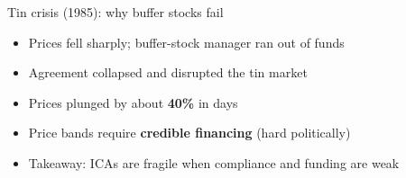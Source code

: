 \documentclass[
  ignorenonframetext,
  aspectratio=169,
]{beamer}
\makeatletter
\providecommand{\tightlist}{%
  \setlength{\itemsep}{0pt}\setlength{\parskip}{0pt}}
\let\quarto@originallabel\label
\DeclareRobustCommand*{\label}[1]{\quarto@originallabel{#1}}
\makeatother
\begin{document}
\begin{frame}{Tin crisis (1985): why buffer stocks fail}
\label{tin-crisis-1985-why-buffer-stocks-fail}
\begin{itemize}
\tightlist
\item
  Prices fell sharply; buffer-stock manager ran out of funds
\item
  Agreement collapsed and disrupted the tin market
\item
  Prices plunged by about \textbf{40\%} in days
\item
  Price bands require \textbf{credible financing} (hard politically)
\item
  Takeaway: ICAs are fragile when compliance and funding are weak
\end{itemize}
\end{frame}
\end{document}
